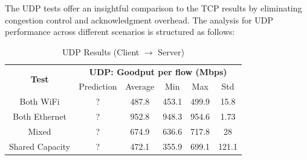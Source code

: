         The UDP tests offer an insightful comparison to the TCP results by eliminating congestion control and acknowledgment overhead. The analysis for UDP performance across different scenarios is structured as follows:

        \begin{table}
            \small
            \centering
            \begin{tabular}{|ll|lllll|}
            \hline
            \multicolumn{2}{|c|}{\multirow{2}{*}{\textbf{Test}}} & 
                \multicolumn{5}{c|}{\textbf{UDP: Goodput per flow (Mbps)}} \\
            \cline{3-7}
            \multicolumn{2}{|c|}{} &
                \multicolumn{1}{c|}{Prediction} &
                \multicolumn{1}{c|}{Average} &
                \multicolumn{1}{c|}{Min} &
                \multicolumn{1}{c|}{Max} &
                \multicolumn{1}{c|}{Std} \\
            \hline
            \multicolumn{2}{|c|}{Both WiFi} &
                \multicolumn{1}{c|}{?} &
                \multicolumn{1}{c|}{487.8} &
                \multicolumn{1}{c|}{453.1} &
                \multicolumn{1}{c|}{499.9} &
                \multicolumn{1}{c|}{15.8} \\
            \hline
            \multicolumn{2}{|c|}{Both Ethernet} &
                \multicolumn{1}{c|}{?} &
                \multicolumn{1}{c|}{952.8} &
                \multicolumn{1}{c|}{948.3} &
                \multicolumn{1}{c|}{954.6} &
                \multicolumn{1}{c|}{1.73} \\
            \hline
            \multicolumn{2}{|c|}{Mixed} &
                \multicolumn{1}{c|}{?} &
                \multicolumn{1}{c|}{674.9} &
                \multicolumn{1}{c|}{636.6} &
                \multicolumn{1}{c|}{717.8} &
                \multicolumn{1}{c|}{28} \\
            \hline
            \multicolumn{2}{|c|}{Shared Capacity} &
                \multicolumn{1}{c|}{?} &
                \multicolumn{1}{c|}{472.1} &
                \multicolumn{1}{c|}{355.9} &
                \multicolumn{1}{c|}{699.1} &
                \multicolumn{1}{c|}{121.1} \\
            \hline
            \end{tabular}
            \vspace{0.5cm}
            \caption{UDP Results (Client $\rightarrow$ Server)}
            \label{tab:udp-results}
        \end{table}

